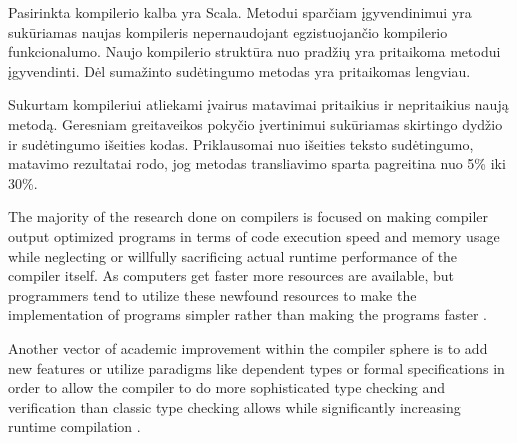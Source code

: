 \documentclass{VUMIFPSbakalaurinis}
\begin{document}
Pasirinkta kompilerio kalba yra Scala.
Metodui sparčiam įgyvendinimui yra sukūriamas naujas kompileris nepernaudojant egzistuojančio kompilerio funkcionalumo.
Naujo kompilerio struktūra nuo pradžių yra pritaikoma metodui įgyvendinti.
Dėl sumažinto sudėtingumo metodas yra pritaikomas lengviau.

Sukurtam kompileriui atliekami įvairus matavimai pritaikius ir nepritaikius naują metodą.
Geresniam greitaveikos pokyčio įvertinimui sukūriamas skirtingo dydžio ir sudėtingumo išeities kodas.
Priklausomai nuo išeities teksto sudėtingumo, matavimo rezultatai rodo, jog metodas transliavimo sparta pagreitina nuo 5\% iki 30\%.




\tableofcontents




The majority of the research done on compilers is focused on making compiler output optimized programs in terms of code execution speed and memory usage \cite{lopes2018future} while neglecting or willfully sacrificing \cite{fast2019compilers} actual runtime performance of the compiler itself.
As computers get faster more resources are available, but programmers tend to utilize these newfound resources to make the implementation of programs simpler rather than making the programs faster \cite{Wirth1995}.

Another vector of academic improvement within the compiler sphere is to add new features or utilize paradigms like dependent types or formal specifications \cite{RustVerification} in order to allow the compiler to do more sophisticated type checking and verification than classic type checking allows while significantly increasing runtime compilation .
\end{document}
